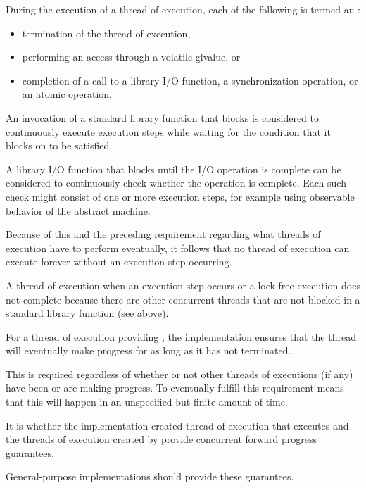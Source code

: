 \pnum
During the execution of a thread of execution, each of the following is termed
an :
\begin{itemize}
\item termination of the thread of execution,
\item performing an access through a volatile glvalue, or
\item completion of a call to a library I/O function, a
      synchronization operation, or an atomic operation.
\end{itemize}

\pnum
An invocation of a standard library function that blocks
is considered to continuously execute execution steps while waiting for the
condition that it blocks on to be satisfied.
\begin{example}
A library I/O function that blocks until the I/O operation is complete can
be considered to continuously check whether the operation is complete. Each
such check might consist of one or more execution steps, for example using
observable behavior of the abstract machine.
\end{example}

\pnum
\begin{note}
Because of this and the preceding requirement regarding what threads of execution
have to perform eventually, it follows that no thread of execution can execute
forever without an execution step occurring.
\end{note}

\pnum
A thread of execution 
when an execution step occurs or a
lock-free execution does not complete because there are other concurrent threads
that are not blocked in a standard library function (see above).

\pnum
{}%
For a thread of execution providing ,
the implementation ensures that the thread will eventually make progress for as
long as it has not terminated.
\begin{note}
This is required regardless of whether or not other threads of executions (if any)
have been or are making progress. To eventually fulfill this requirement means that
this will happen in an unspecified but finite amount of time.
\end{note}

\pnum
It is  whether the
implementation-created thread of execution that executes
 and the threads of execution created by
 provide concurrent forward progress
guarantees.
\begin{note}
General-purpose implementations should provide these guarantees.
\end{note}

